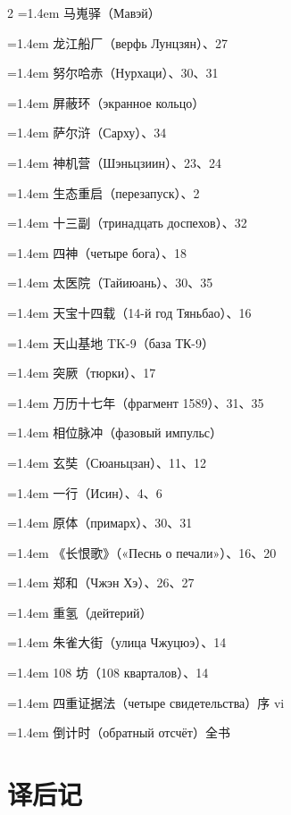 {\begin{multicols}{2}
\hangindent=1.4em 马嵬驿（Мавэй）

\hangindent=1.4em 龙江船厂（верфь Лунцзян）、27

\hangindent=1.4em 努尔哈赤（Нурхаци）、30、31

\hangindent=1.4em 屏蔽环（экранное кольцо）

\hangindent=1.4em 萨尔浒（Сарху）、34

\hangindent=1.4em 神机营（Шэньцзиин）、23、24

\hangindent=1.4em 生态重启（перезапуск）、2

\hangindent=1.4em 十三副（тринадцать доспехов）、32

\hangindent=1.4em 四神（четыре бога）、18

\hangindent=1.4em 太医院（Тайиюань）、30、35

\hangindent=1.4em 天宝十四载（14-й год Тяньбао）、16

\hangindent=1.4em 天山基地 TK-9（база ТК-9）

\hangindent=1.4em 突厥（тюрки）、17

\hangindent=1.4em 万历十七年（фрагмент 1589）、31、35

\hangindent=1.4em 相位脉冲（фазовый импульс）

\hangindent=1.4em 玄奘（Сюаньцзан）、11、12

\hangindent=1.4em 一行（Исин）、4、6

\hangindent=1.4em 原体（примарх）、30、31

\hangindent=1.4em 《长恨歌》（«Песнь о печали»）、16、20

\hangindent=1.4em 郑和（Чжэн Хэ）、26、27

\hangindent=1.4em 重氢（дейтерий）

\hangindent=1.4em 朱雀大街（улица Чжуцюэ）、14

\hangindent=1.4em 108 坊（108 кварталов）、14

\hangindent=1.4em 四重证据法（четыре свидетельства）\dotfill 序 vi

\hangindent=1.4em 倒计时（обратный отсчёт）\dotfill 全书

\end{multicols}
}

\clearpage
\chapter*{译\quad 后\quad 记}

